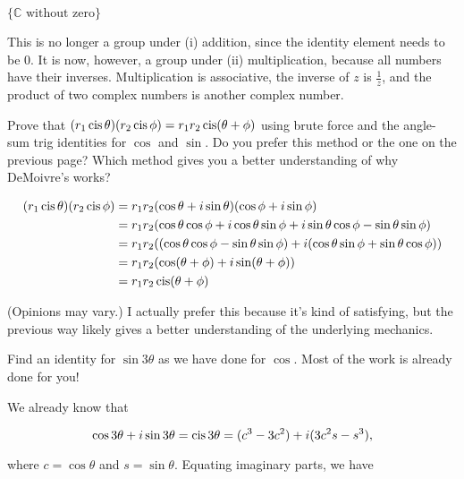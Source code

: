 \documentclass[../key.tex]{subfiles}
\begin{document}
\begin{inner_problem}
\item $\{\mathbb{C}\text{ without zero}\}$
\end{inner_problem}

This is no longer a group under (i) addition, since the identity element needs to be $0$. It is now, however, a group under (ii) multiplication, because all numbers have their inverses. Multiplication is associative, the inverse of $z$ is $\frac{1}{z}$, and the product of two complex numbers is another complex number.

\begin{outer_problem}
\item Prove that $(r_1\operatorname{cis} \theta)(r_2\operatorname{cis} \phi) = r_1r_2 \operatorname{cis}(\theta + \phi)$ using brute force and the angle-sum trig identities for $\cos$ and $\sin$. Do you prefer this method or the one on the previous page? Which method gives you a better understanding of why DeMoivre's works?
\end{outer_problem}

\begin{align*}
(r_1\operatorname{cis} \theta)(r_2\operatorname{cis} \phi) &= r_1r_2(\cos \theta + i\sin \theta)(\cos \phi + i\sin \phi) \\
&= r_1r_2(\cos\theta\cos\phi + i\cos\theta\sin\phi + i\sin\theta\cos\phi - \sin\theta\sin\phi) \\
&= r_1r_2((\cos\theta\cos\phi - \sin\theta\sin\phi) + i(\cos\theta\sin\phi+\sin\theta\cos\phi)) \\
&= r_1r_2(\cos(\theta+\phi) + i\sin(\theta + \phi)) \\
&= r_1r_2\operatorname{cis}(\theta + \phi)
\end{align*}

(Opinions may vary.) I actually prefer this because it's kind of satisfying, but the previous way likely gives a better understanding of the underlying mechanics.

\begin{outer_problem}
\item Find an identity for $\sin 3\theta$ as we have done for $\cos$. Most of the work is already done for you!
\end{outer_problem}

We already know that

$$\cos 3\theta + i\sin 3\theta = \operatorname{cis} 3\theta = (c^3 - 3c^2) + i (3c^2 s - s^3),$$

where $c=\cos\theta$ and $s=\sin\theta$. Equating imaginary parts, we have
\end{document}
